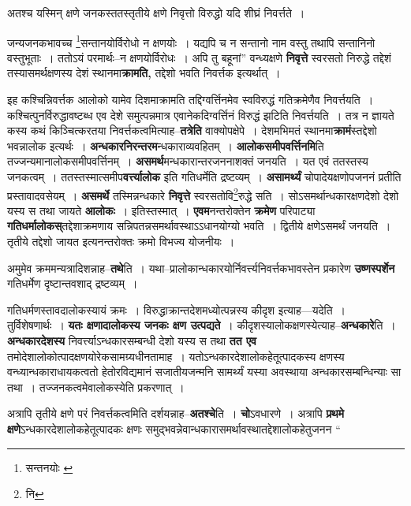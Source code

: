 \documentclass[article,12pt,a4paper]{memoir}
\begin{document}
	अतश्च यस्मिन् क्षणे जनकस्ततस्तृतीये क्षणे निवृत्तो विरुद्धो यदि शीघ्रं निवर्त्तते । 
	  
	जन्यजनकभावच्च \footnote{सन्तनयोः \cite{dp-msA}}\-सन्तानयोर्विरोधो न क्षणयोः । यद्यपि च न सन्तानो नाम वस्तु तथापि सन्तानिनो वस्तुभूताः । ततोऽयं परमार्थः--न क्षणयोर्विरोधः । अपि तु बहूनां” वन्ध्यक्षणे \textbf{निवृत्ते} स्वरसतो निरुद्धे तद्देशं तस्यासमर्थक्षणस्य देशं स्थानमा\textbf{क्रामति,} तद्देशो भवति निवर्त्तक इत्यर्थात् ।
	\pend
      

	  \pstart इह कश्चिन्निवर्त्तक आलोको यामेव दिशमाक्रामति तद्दिग्वर्त्तिनमेव स्वविरुद्धं गतिक्रमेणैव निवर्त्तयति । कश्चित्पुनर्विरुद्धावष्टब्ध एव देशे समुत्पन्नमात्र एवानेकदिग्वर्त्तिनं विरुद्धं झटिति निवर्त्तयति । तत्र न ज्ञायते कस्य कथं किञ्चित्करतया निवर्त्तकत्वमित्याह--\textbf{तत्रेति} वाक्योपक्षेपे । देशमभिमतं स्थानमा\textbf{क्रामं}स्तद्देशो भवन्नालोक इत्यर्थः । \textbf{अन्धकारनिरन्तरम}न्धकाराव्यवहितम् । \textbf{आलोकसमीपवर्त्तिनमि}ति तज्जन्यमानालोकसमीपवर्त्तिनम् । \textbf{असमर्थ}मन्धकारान्तरजननाशक्तं जनयति । यत एवं ततस्तस्य जनकत्वम् । ततस्तस्मात्समीप\textbf{वर्त्त्यालोक} इति गतिधर्मेति द्रष्टव्यम् । \textbf{असामर्थ्यं} चो\leavevmode{}पादेयक्षणोपजननं प्रतीति प्रस्तावादवसेयम् । \textbf{असमर्थे} तस्मिन्नन्धकारे \textbf{निवृत्ते} स्वरसतोवि\footnote{नि}\-रुद्धे सति । सोऽसमर्थान्धकारक्षणदेशो देशो यस्य स तथा जायते \textbf{आलोकः} । इतिस्तस्मात् । \textbf{एवम}नन्तरोक्तेन \textbf{क्रमेण} परिपाट्या \textbf{गतिधर्मालोकस्}तद्देशाक्रमणाय सन्निपतन्नसमर्थावस्थाऽऽधानयोग्यो भवति । द्वितीये क्षणेऽसमर्थं जनयति । तृतीये तद्देशो जायत इत्यनन्तरोक्तः क्रमो विभज्य योजनीयः ।
	\pend
      

	  \pstart अमुमेव क्रममन्यत्रादिशन्नाह--\textbf{तथे}ति । यथा--प्रालोकान्धकारयोर्निवर्त्त्यनिवर्त्तकभावस्तेन प्रकारेण \textbf{उष्णस्पर्शेन} गतिधर्मेण दृष्टान्तवशाद् द्रष्टव्यम् ।
	\pend
      

	  \pstart गतिधर्मणस्तावदालोकस्यायं क्रमः । विरुद्धाक्रान्तदेशमध्योत्पन्नस्य कीदृश इत्याह—यदेति । तुर्विशेषणार्थः । \textbf{यतः क्षणादालोकस्य जनकः क्षण उत्पद्यते} । कीदृशस्यालोकक्षणस्येत्याह--\textbf{अन्धकारे}ति । \textbf{अन्धकारदेशस्य} निवर्त्त्याऽन्धकारसम्बन्धी देशो यस्य स तथा \textbf{तत एव} तमोदेशालोकोत्पादक्षणयोरेकसामग्र्यधीनतामाह । यतोऽन्धकारदेशालोकहेतूत्पादकस्य क्षणस्य वन्ध्यान्धकाराधायकत्वतो हेतोरविद्यमानं सजातीयजन्मनि सामर्थ्यं यस्या अवस्थाया अन्धकारसम्बन्धिन्याः सा तथा । तज्जनकत्वमेवालोकस्येति प्रकरणात् ।
	\pend
      

	  \pstart अत्रापि तृतीये क्षणे परं निवर्त्तकत्वमिति दर्शयन्नाह--\textbf{अतश्चे}ति । \textbf{चो}ऽवधारणे । अत्रापि \textbf{प्रथमे क्षणे}ऽन्धकारदेशालोकहेतूत्पादकः क्षणः समुद्भवन्नेवान्धकारासमर्थावस्थातद्देशालोकहेतुजनन  \leavevmode{} “
	  
\end{document}
